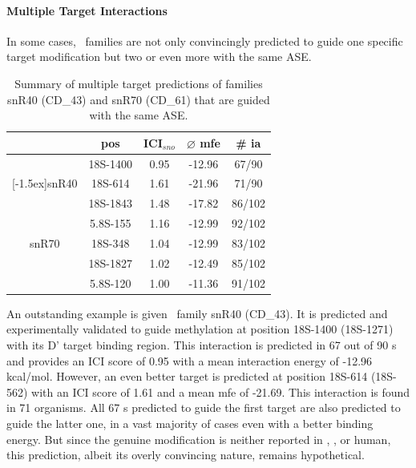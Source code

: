 
\paragraph{\textbf{Multiple Target Interactions}}
In some cases, \sno\ families are not only convincingly
predicted to guide one specific target modification but two or even
more with the same ASE.
\begin{table}
  \caption{Summary of multiple target predictions of families 
    snR40 (CD\_43) and snR70 (CD\_61) that are guided with the same ASE.}
  \label{tab:redundant_predictions}
  \begin{center}
    \begin{footnotesize}
      \begin{tabular}{c|c|c|c|c}
        &pos&ICI$_{sno}$&$\varnothing$
          mfe&\# ia\\
        \hline
        &18S-1400&0.95&-12.96&67/90\\
        \raisebox{1.5ex}[-1.5ex]{snR40}&18S-614&1.61&-21.96&71/90\\
        \hline
        &18S-1843&1.48&-17.82&86/102\\
        &5.8S-155&1.16&-12.99&92/102\\
        snR70&18S-348&1.04&-12.99&83/102\\
        &18S-1827&1.02&-12.49&85/102\\
        &5.8S-120&1.00&-11.36&91/102\\
      \end{tabular}
    \end{footnotesize}
  \end{center}
\end{table}
An outstanding example is given \cd\ family snR40 (CD\_43). It is predicted
and experimentally validated  to guide methylation at position
18S-1400 (18S-1271) with its D' target binding region. This interaction is
predicted in 67 out of 90 \sno s and provides an ICI score of 0.95 with a
mean interaction energy of -12.96 kcal/mol. However, an even better target
is predicted at position 18S-614 (18S-562) with an ICI score of 1.61 and a
mean mfe of -21.69. This interaction is found in 71 organisms. All 67 \sno
s predicted to guide the first target are also predicted to guide the
latter one, in a vast majority of cases even with a better binding
energy. But since the genuine modification is neither reported in \sce,
\ncr, or human, this prediction, albeit its overly convincing nature,
remains hypothetical.

